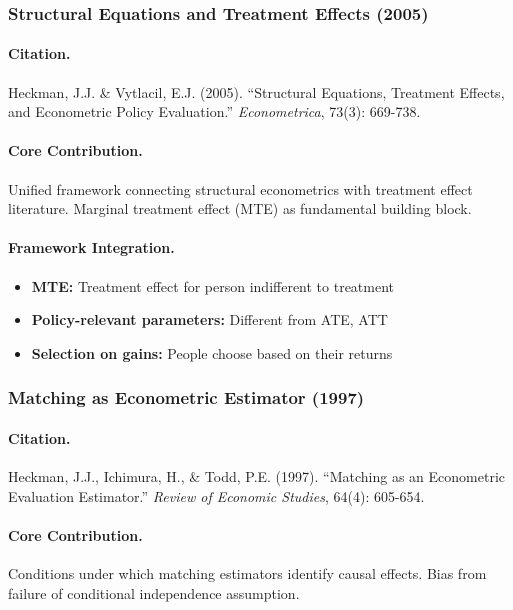 \subsubsection{Structural Equations and Treatment Effects (2005)}

\paragraph{Citation.}
Heckman, J.J. \& Vytlacil, E.J. (2005). ``Structural Equations, Treatment
Effects, and Econometric Policy Evaluation.'' \emph{Econometrica}, 73(3): 669-738.

\paragraph{Core Contribution.}
Unified framework connecting structural econometrics with treatment effect
literature. Marginal treatment effect (MTE) as fundamental building block.

\paragraph{Framework Integration.}
\begin{itemize}
  \item \textbf{MTE:} Treatment effect for person indifferent to treatment
  \item \textbf{Policy-relevant parameters:} Different from ATE, ATT
  \item \textbf{Selection on gains:} People choose based on their returns
\end{itemize}

\subsubsection{Matching as Econometric Estimator (1997)}

\paragraph{Citation.}
Heckman, J.J., Ichimura, H., \& Todd, P.E. (1997). ``Matching as an
Econometric Evaluation Estimator.'' \emph{Review of Economic Studies}, 64(4): 605-654.

\paragraph{Core Contribution.}
Conditions under which matching estimators identify causal effects.
Bias from failure of conditional independence assumption.

